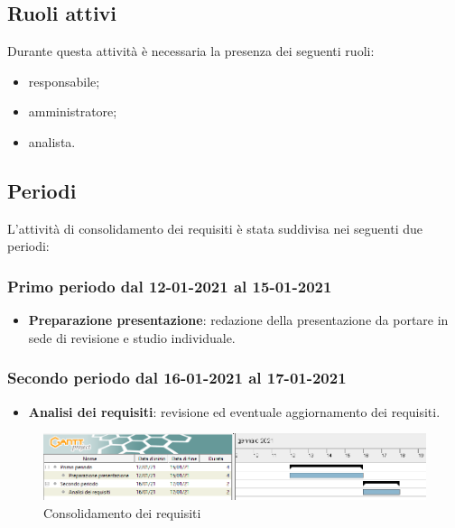 	\subsection{Ruoli attivi}
	Durante questa attività è necessaria la presenza dei seguenti ruoli:
	\begin{itemize}
	\item responsabile;
	\item amministratore;
	\item analista.
	\end{itemize}

	\subsection{Periodi}
	L’attività di consolidamento dei requisiti è stata suddivisa nei seguenti due periodi:
	
	\subsubsection{Primo periodo dal 12-01-2021 al 15-01-2021}
	\begin{itemize}
	
	\item \textbf{Preparazione presentazione}: redazione della presentazione da portare in sede di revisione e
	studio individuale.
	
	\end{itemize}	
	
	\subsubsection{Secondo periodo dal 16-01-2021 al 17-01-2021}
	\begin{itemize}
		
	\item \textbf{Analisi dei requisiti}: revisione ed eventuale aggiornamento dei requisiti.
		
	\end{itemize}

	\newpage
	
	\begin{landscape}
		\begin{figure}[h!]
			\includegraphics[width=24cm]{images/2_Consolidamento_dei_requisiti.png}
			\caption{Consolidamento dei requisiti}
		\end{figure}
	\end{landscape}

